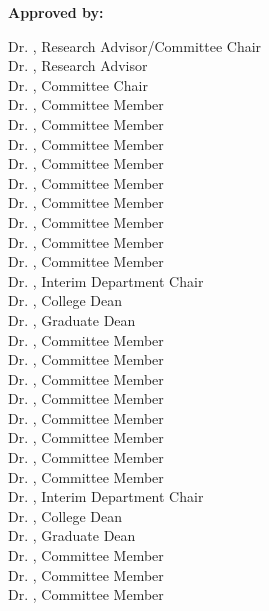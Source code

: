 \begin{titlepage}
\begin{center}
    \end{center}
    

\vfill

\textbf{Approved by:}


\vspace{.1cm}

\ifdefined\reschair
\noindent
Dr. \reschair, Research Advisor/Committee Chair\\
\else
\noindent
Dr. \resadv, Research Advisor \\
Dr. \comchair, Committee Chair\\
\fi
\ifdefined\commemi
\noindent
Dr. \commema, Committee Member\\
Dr. \commemb, Committee Member\\
Dr. \commemc, Committee Member\\
Dr. \commemd, Committee Member\\
Dr. \commeme, Committee Member\\
Dr. \commemf, Committee Member\\
Dr. \commemg, Committee Member\\
Dr. \commemh, Committee Member\\
Dr. \commemi, Committee Member\\
Dr. \depchair, Interim Department Chair\\
Dr. \colldean, College Dean\\
Dr. \graddean, Graduate Dean\\
\else
\ifdefined\commemh
\noindent
Dr. \commema, Committee Member\\
Dr. \commemb, Committee Member\\
Dr. \commemc, Committee Member\\
Dr. \commemd, Committee Member\\
Dr. \commeme, Committee Member\\
Dr. \commemf, Committee Member\\
Dr. \commemg, Committee Member\\
Dr. \commemh, Committee Member\\
Dr. \depchair, Interim Department Chair\\
Dr. \colldean, College Dean\\
Dr. \graddean, Graduate Dean\\
\else
\ifdefined\commemg
\noindent
Dr. \commema, Committee Member\\
Dr. \commemb, Committee Member\\
Dr. \commemc, Committee Member\\

\end{titlepage}
